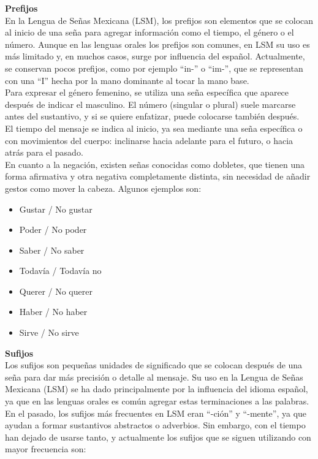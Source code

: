 \textbf{Prefijos}\\
En la Lengua de Señas Mexicana (LSM), los prefijos son elementos que se colocan al inicio de una seña para agregar información como el tiempo, el género o el número. Aunque en las lenguas orales los prefijos son comunes, en LSM su uso es más limitado y, en muchos casos, surge por influencia del español. Actualmente, se conservan pocos prefijos, como por ejemplo “in-” o “im-”, que se representan con una “I” hecha por la mano dominante al tocar la mano base.\\

Para expresar el género femenino, se utiliza una seña específica que aparece después de indicar el masculino. El número (singular o plural) suele marcarse antes del sustantivo, y si se quiere enfatizar, puede colocarse también después.\\

El tiempo del mensaje se indica al inicio, ya sea mediante una seña específica o con movimientos del cuerpo: inclinarse hacia adelante para el futuro, o hacia atrás para el pasado.\\

En cuanto a la negación, existen señas conocidas como dobletes, que tienen una forma afirmativa y otra negativa completamente distinta, sin necesidad de añadir gestos como mover la cabeza. Algunos ejemplos son:
\begin{itemize}
    \item Gustar / No gustar
    \item Poder / No poder
    \item Saber / No saber
    \item Todavía / Todavía no
    \item Querer / No querer
    \item Haber / No haber
    \item Sirve / No sirve
\end{itemize}

\textbf{Sufijos}\\
Los sufijos son pequeñas unidades de significado que se colocan después de una seña para dar más precisión o detalle al mensaje. Su uso en la Lengua de Señas Mexicana (LSM) se ha dado principalmente por la influencia del idioma español, ya que en las lenguas orales es común agregar estas terminaciones a las palabras.\\

En el pasado, los sufijos más frecuentes en LSM eran “-ción” y “-mente”, ya que ayudan a formar sustantivos abstractos o adverbios. Sin embargo, con el tiempo han dejado de usarse tanto, y actualmente los sufijos que se siguen utilizando con mayor frecuencia son:

